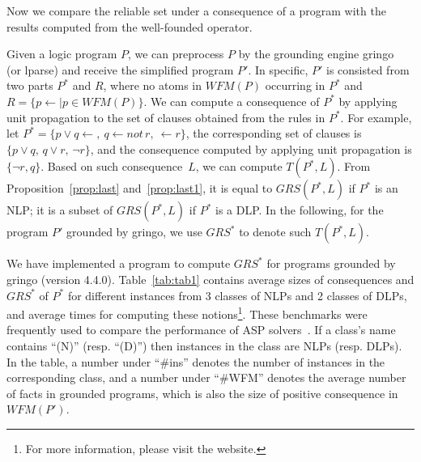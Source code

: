 \documentclass{article}
\newcommand{\Not}{not \,}
\newcommand{\WFM}{W\!F\!M}
\newcommand{\GRS}{G\!R\!S}
\newcommand{\RS}{R\!S}
\begin{document}


Now we compare the reliable set under a consequence of a program with the results computed from the well-founded operator.


Given a logic program $P$, we can preprocess $P$ by the grounding engine gringo~\cite{gebser2007gringo} (or lparse) and receive the simplified program $P'$. In specific, $P'$ is consisted from two parts $P^*$ and $R$, where no atoms in $\WFM(P)$ occurring in $P^*$ and $R = \{ p\gets \mid p\in \WFM(P)\}$.
We can compute a consequence of $P^*$ by applying unit propagation to the set of clauses obtained from the rules in $P^*$. For example, let $P^* = \{ p \lor q \gets, \ q \gets \Not r, \ \gets r\}$, the corresponding set of clauses is $\{ p\lor q, \, q \lor r,\, \neg r\}$, and the consequence computed by applying unit propagation is $\{\neg r, q\}$.
Based on such consequence~$L$, we can compute $T(P^*, L)$. From Proposition~\ref{prop:last} and~\ref{prop:last1}, it is equal to $\GRS(P^*, L)$ if $P^*$ is an NLP; it is a subset of $\GRS(P^*, L)$ if $P^*$ is a DLP. In the following, for the program $P'$ grounded by gringo, we use $\GRS^*$ to denote such $T(P^*, L)$.%


We have implemented a program to compute $\GRS^*$ for programs grounded by gringo (version 4.4.0).
Table~\ref{tab:tab1} contains average sizes of consequences and $\GRS^*$ of $P^*$ for different instances from 3 classes of NLPs and 2 classes of DLPs, and average times for computing these notions\footnote{%
For more information, please visit the website.}. These benchmarks were frequently used to compare the performance of ASP solvers~\cite{denecker2009second,gebser2013advanced}. If a class's name contains ``(N)'' (resp. ``(D)'') then instances in the class are NLPs (resp. DLPs).
In the table, a number under ``\#ins'' denotes the number of instances in the corresponding class, and
 a number under ``\#WFM'' denotes the average number of facts in grounded programs, which is also the size of positive consequence in $\WFM(P')$.
\end{document}
